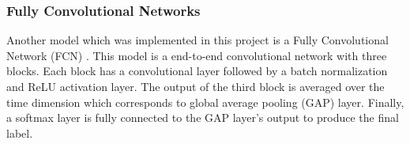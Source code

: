 \subsubsection{Fully Convolutional Networks}
Another model which was implemented in this project is a Fully Convolutional Network (FCN) \cite{WangTimeBaseline}. This model is a end-to-end convolutional network with three blocks. Each block has a convolutional layer followed by a batch normalization and ReLU activation layer. The output of the third block is averaged over the time dimension which corresponds to global average pooling (GAP) layer. Finally, a softmax layer is fully connected to the GAP layer’s output to produce the final label.


